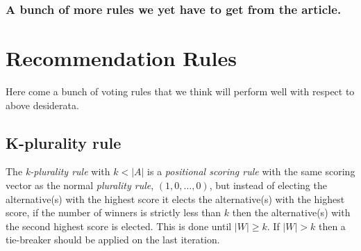 \documentclass{article}
\begin{document}
 \subsubsection{A bunch of more rules we yet have to get from the article.} 


\section{Recommendation Rules}

Here come a bunch of voting rules that we think will perform well with respect to above desiderata.





\subsection{K-plurality rule}

The {\em k-plurality rule} with $k<|A|$ is a {\em positional scoring rule} with the same scoring vector as the normal
{\em plurality rule}, $(1,0, \dots, 0)$, but instead of electing the alternative(s) with the highest score it elects the
alternative(s) with the highest score, if the number of winners is strictly less than $k$ then the alternative(s) with
the second highest score is elected. This is done until $|W| \geq k$. If $|W| > k$ then a tie-breaker should be applied
on the last iteration.
\end{document}
